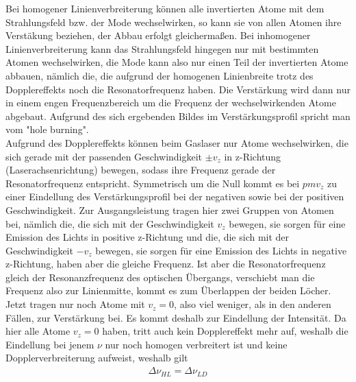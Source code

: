 \documentclass[a4paper,twoside,final]{article}
\begin{document}
Bei homogener Linienverbreiterung können alle invertierten Atome mit dem Strahlungsfeld bzw. der Mode wechselwirken, so kann sie von allen Atomen ihre Verstäkung beziehen, der Abbau erfolgt gleichermaßen. Bei inhomogener Linienverbreiterung kann das Strahlungsfeld hingegen nur mit bestimmten Atomen wechselwirken, die Mode kann also nur einen Teil der invertierten Atome abbauen, nämlich die, die aufgrund der homogenen Linienbreite trotz des Dopplereffekts noch die Resonatorfrequenz haben. Die Verstärkung wird dann nur in einem engen Frequenzbereich um die Frequenz der wechselwirkenden Atome abgebaut. Aufgrund des sich ergebenden Bildes im Verstärkungsprofil spricht man vom "hole burning". \\
Aufgrund des Dopplereffekts können beim Gaslaser nur Atome wechselwirken, die sich gerade mit der passenden Geschwindigkeit $\pm v_z$ in z-Richtung (Laserachsenrichtung) bewegen, sodass ihre Frequenz gerade der Resonatorfrequenz entspricht.  Symmetrisch um die Null kommt es bei $pm v_z$ zu einer Eindellung des Verstärkungsprofil bei der negativen sowie bei der positiven Geschwindigkeit. Zur Ausgangsleistung tragen hier zwei Gruppen von Atomen bei, nämlich die, die sich mit der Geschwindigkeit $v_z$ bewegen, sie sorgen für eine Emission des Lichts in positive z-Richtung und die, die sich mit der Geschwindigkeit $-v_z$ bewegen, sie sorgen für eine Emission des Lichts in negative z-Richtung, haben aber die gleiche Frequenz. Ist aber die Resonatorfrequenz gleich der Resonanzfrequenz des optischen Übergangs, verschiebt man die Frequenz also zur Linienmitte, kommt es zum Überlappen der beiden Löcher. Jetzt tragen nur noch Atome mit $v_z = 0$, also viel weniger, als in den anderen Fällen, zur Verstärkung bei. Es kommt deshalb zur Eindellung der Intensität. Da hier alle Atome $v_z = 0 $ haben, tritt auch kein Dopplereffekt mehr auf, weshalb die Eindellung bei jenem $\nu$ nur noch homogen verbreitert ist und keine Dopplerverbreiterung aufweist, weshalb gilt
\begin{align}
  \Delta \nu_{HL} = \Delta \nu_{LD}
\end{align}
\end{document}
